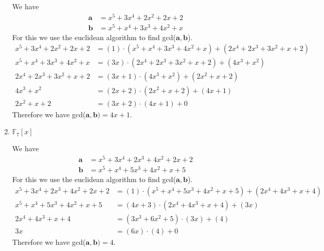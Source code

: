 \documentclass[a4paper, 11pt]{article}
\begin{document}
\begin{enumerate}[label=(\alph*)]
        We have
        \begin{align*}
            \bm{a} &= x^5 + 3x^4 + 2x^2 + 2x + 2\\
            \bm{b} &= x^5 + x^4 + 3x^3 + 4x^2 + x 
        \end{align*}
        For this we use the euclidean algorithm to find gcd($\bm{a},\bm{b}$).
        \begin{align*}
            x^5 + 3x^4 + 2x^2 + 2x + 2 &= (1)\cdot(x^5 + x^4 + 3x^3 + 4x^2 + x) + (2x^4 + 2x^3 + 3x^2 + x + 2)\\
            x^5 + x^4 + 3x^3 + 4x^2 + x &= (3x)\cdot(2x^4 + 2x^3 + 3x^2 + x + 2) + (4x^3 + x^2)\\
            2x^4 + 2x^3 + 3x^2 + x + 2 &= (3x+1)\cdot(4x^3 + x^2) + (2x^2 + x + 2)\\
            4x^3 + x^2 &= (2x + 2)\cdot(2x^2 + x + 2) + (4x + 1)\\
            2x^2 + x + 2 &= (3x+2)\cdot(4x + 1) + 0
        \end{align*}
        Therefore we have gcd($\bm{a},\bm{b}) = 4x + 1$.
        
        \item $\mathbb{F}_7[x]$
        
        We have
        \begin{align*}
            \bm{a} &= x^5 + 3x^4 + 2x^3 + 4x^2 + 2x + 2\\
            \bm{b} &= x^5 + x^4 + 5x^3 + 4x^2 + x + 5
        \end{align*}
        For this we use the euclidean algorithm to find gcd($\bm{a},\bm{b}$).
        \begin{align*}
            x^5 + 3x^4 + 2x^3 + 4x^2 + 2x + 2 &= (1)\cdot(x^5 + x^4 + 5x^3 + 4x^2 + x + 5) + (2x^4 + 4x^3 + x + 4)\\
            x^5 + x^4 + 5x^3 + 4x^2 + x + 5 &= (4x + 3)\cdot(2x^4 + 4 x^3 + x + 4) + (3x)\\
            2x^4 + 4 x^3 + x + 4 &= (3x^3 + 6x^2 + 5)\cdot(3x) + (4)\\
            3x &= (6x)\cdot(4) + 0
        \end{align*}
        Therefore we have gcd($\bm{a},\bm{b}) = 4$.
    \end{enumerate}
    
\end{document}
